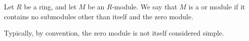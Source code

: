 \documentclass{article}
\begin{document}
Let $R$ be a ring, and let $M$ be an $R$-module.
We say that $M$ is a {} 
or {} {\PMlinkescapetext module }
if it contains no submodules 
other than itself and the zero module.

Typically, by convention, the zero module is not itself considered simple.
\end{document}
